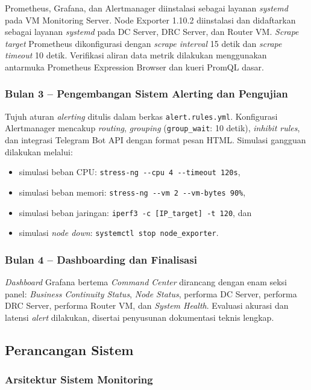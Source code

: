 \documentclass[10pt,twocolumn]{article}
\begin{document}
Prometheus, Grafana, dan Alertmanager diinstalasi sebagai layanan \textit{systemd} pada VM Monitoring
Server. Node Exporter 1.10.2 diinstalasi dan didaftarkan sebagai layanan \textit{systemd} pada DC
Server, DRC Server, dan Router VM. \textit{Scrape target} Prometheus dikonfigurasi dengan
\textit{scrape interval} 15 detik dan \textit{scrape timeout} 10 detik. Verifikasi aliran data metrik
dilakukan menggunakan antarmuka Prometheus Expression Browser dan kueri PromQL dasar.

\subsubsection{Bulan 3 -- Pengembangan Sistem Alerting dan Pengujian}

Tujuh aturan \textit{alerting} ditulis dalam berkas \texttt{alert.rules.yml}. Konfigurasi
Alertmanager mencakup \textit{routing}, \textit{grouping} (\texttt{group\_wait}: 10 detik),
\textit{inhibit rules}, dan integrasi Telegram Bot API dengan format pesan HTML. Simulasi gangguan
dilakukan melalui:
\begin{itemize}[leftmargin=*]
  \item simulasi beban CPU: \texttt{stress-ng -{}-cpu 4 -{}-timeout 120s},
  \item simulasi beban memori: \texttt{stress-ng -{}-vm 2 -{}-vm-bytes 90\%},
  \item simulasi beban jaringan: \texttt{iperf3 -c [IP\_target] -t 120}, dan
  \item simulasi \textit{node down}: \texttt{systemctl stop node\_exporter}.
\end{itemize}

\subsubsection{Bulan 4 -- Dashboarding dan Finalisasi}

\textit{Dashboard} Grafana bertema \textit{Command Center} dirancang dengan enam seksi panel:
\textit{Business Continuity Status}, \textit{Node Status}, performa DC Server, performa DRC Server,
performa Router VM, dan \textit{System Health}. Evaluasi akurasi dan latensi \textit{alert} dilakukan,
disertai penyusunan dokumentasi teknis lengkap.

\subsection{Perancangan Sistem}

\subsubsection{Arsitektur Sistem Monitoring}
\end{document}
